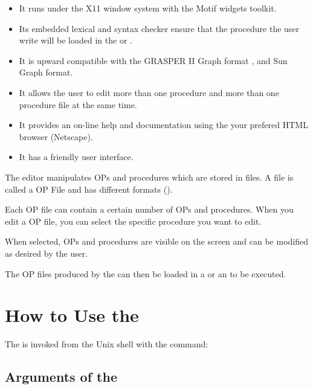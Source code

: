 \begin{itemize}

\item It runs under the X11 window system with the Motif widgets toolkit.

\item Its embedded lexical and syntax checker ensure that the procedure
the user write  will be loaded in the \CPK{} or \XPK{}.

\item It is upward compatible with the  GRASPER II Graph format , and
Sun Graph format.

\item It allows the user to edit more than one procedure and more than
one procedure file at the same time.

\item It provides an on-line help and documentation using the your prefered
  HTML browser (Netscape).

\item It has a friendly user interface.

\end{itemize}

The editor manipulates OPs and procedures which are stored in files. A
file is called a OP File and has different formats ().

Each OP file can contain a certain number of OPs and procedures. When you
edit a
OP file, you can select the specific procedure you want to edit.

When selected, OPs and procedures are visible on the screen and can be
modified as desired by the user.

The OP files produced by the \OPE{} can then be loaded in a \CPK{} or an
\XPK{} to be executed.

\chapter{How to Use the \OPE{}}


The \OPE{} is invoked from the Unix shell with the command:




\section{Arguments of the \OPE{}}

